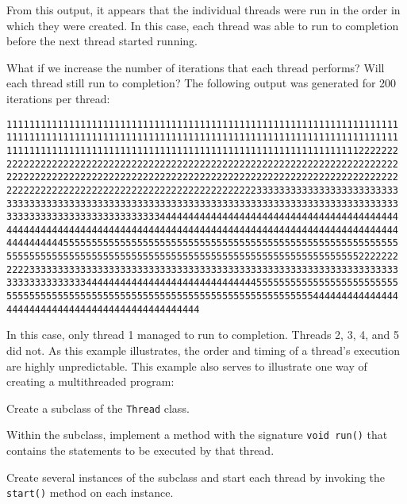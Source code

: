 \noindent From this output, it appears that the individual threads
were run in the order in which they were created.  In this case, each
thread was able to run to completion before the next thread started
running.

What if we increase the number of iterations that each thread performs?
Will each thread still run to completion? The following output was
generated for 200 iterations per thread:

\begin{jjjlisting}
\begin{lstlisting}[basicstyle=\scriptsize]
111111111111111111111111111111111111111111111111111111111111111111111
111111111111111111111111111111111111111111111111111111111111111111111
111111111111111111111111111111111111111111111111111111111111112222222
222222222222222222222222222222222222222222222222222222222222222222222
222222222222222222222222222222222222222222222222222222222222222222222
222222222222222222222222222222222222222222223333333333333333333333333
333333333333333333333333333333333333333333333333333333333333333333333
333333333333333333333333333444444444444444444444444444444444444444444
444444444444444444444444444444444444444444444444444444444444444444444
444444444455555555555555555555555555555555555555555555555555555555555
555555555555555555555555555555555555555555555555555555555555552222222
222233333333333333333333333333333333333333333333333333333333333333333
333333333333334444444444444444444444444444445555555555555555555555555
555555555555555555555555555555555555555555555555555555444444444444444
4444444444444444444444444444444444
\end{lstlisting}
\end{jjjlisting}

\noindent In this case, only thread 1 managed to run
to completion.  Threads 2, 3, 4, and 5 did not.  As this example
illustrates, the order and timing of a thread's execution are highly
unpredictable.  This example also serves to illustrate one way of
creating a multithreaded program:


\begin{BL}
\item Create a subclass of the {\tt Thread} class.
\item Within the subclass, implement a method with the signature 
 {\tt void run()} that contains the statements to be executed by that
 thread.
\item Create several instances of the subclass and start each
 thread by invoking the {\tt start()} method on each instance.
\end{BL}

